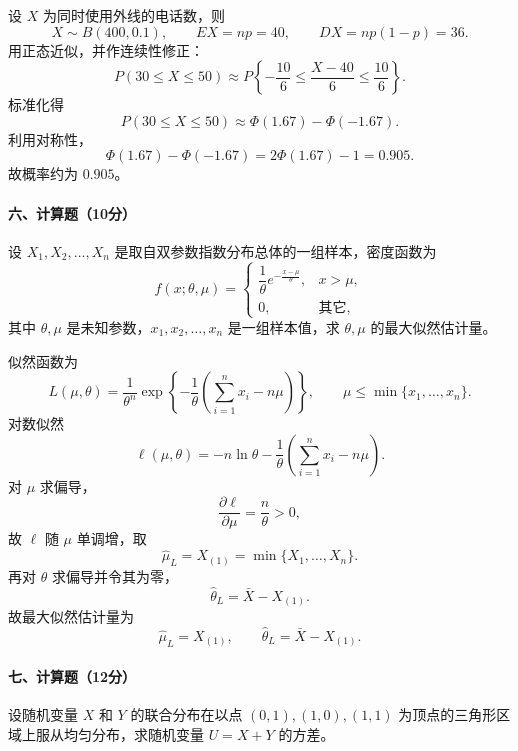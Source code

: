 \documentclass[lang=cn,11pt]{elegantbook}
\begin{document}
\begin{solution}
\par
设 \(X\) 为同时使用外线的电话数，则
\[
  X\sim B(400,0.1),\qquad EX=np=40,\qquad D X=np(1-p)=36.
\]
用正态近似，并作连续性修正：
\[
  P(30\le X\le50)\approx P\!\left\{-\frac{10}{6}\le \frac{X-40}{6}\le\frac{10}{6}\right\}.
\]
标准化得
\[
  P(30\le X\le50)\approx \Phi(1.67)-\Phi(-1.67).
\]
利用对称性，
\[
  \Phi(1.67)-\Phi(-1.67)=2\Phi(1.67)-1=0.905.
\]
故概率约为 \(0.905\)。
\end{solution}

\paragraph*{六、计算题（10分）}
\begin{exercise}
\par
设 \(X_1,X_2,\dots,X_n\) 是取自双参数指数分布总体的一组样本，密度函数为
\[
f(x;\theta,\mu)=
\begin{cases}
\dfrac{1}{\theta}e^{-\frac{x-\mu}{\theta}}, & x>\mu,\\
0, & \text{其它},
\end{cases}
\]
其中 \(\theta,\mu\) 是未知参数，\(x_1,x_2,\dots,x_n\) 是一组样本值，求 \(\theta,\mu\) 的最大似然估计量。
\end{exercise}

\begin{solution}
\par
似然函数为
\[
  L(\mu,\theta)=\frac{1}{\theta^n}\exp\!\left\{-\frac{1}{\theta}\left(\sum_{i=1}^n x_i-n\mu\right)\right\},
  \qquad \mu\le \min\{x_1,\dots,x_n\}.
\]
对数似然
\[
  \ell(\mu,\theta)=-n\ln\theta-\frac{1}{\theta}\left(\sum_{i=1}^n x_i-n\mu\right).
\]
对 \(\mu\) 求偏导，
\[
  \frac{\partial \ell}{\partial\mu}=\frac{n}{\theta}>0,
\]
故 \(\ell\) 随 \(\mu\) 单调增，取
\[
  \hat{\mu}_L=X_{(1)}=\min\{X_1,\dots,X_n\}.
\]
再对 \(\theta\) 求偏导并令其为零，
\[
  \hat{\theta}_L=\bar{X}-X_{(1)}.
\]
故最大似然估计量为
\[
  \hat{\mu}_L=X_{(1)},\qquad \hat{\theta}_L=\bar{X}-X_{(1)}.
\]
\end{solution}

\paragraph*{七、计算题（12分）}
\begin{exercise}
\par
设随机变量 \(X\) 和 \(Y\) 的联合分布在以点 \((0,1),(1,0),(1,1)\) 为顶点的三角形区域上服从均匀分布，求随机变量 \(U=X+Y\) 的方差。
\end{exercise}
\end{document}
